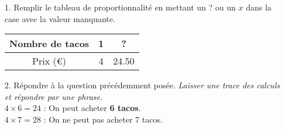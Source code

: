 \documentclass[12pt]{article}
\begin{document}
\begin{enumerate}
\item[1.] Remplir le tableau de proportionnalité en mettant un ? ou un $x$ dans la case avec la valeur manquante.

  \begin{center}
    \begin{tabular}{| c || c | c |}
      \hline
      Nombre de tacos & 1 &  ?   \\
      \hline
      Prix (\euro{})  & 4 & 24.50\\
      \hline
    \end{tabular}
  \end{center}

\item[2.] Répondre à la question précédemment posée. \textit{Laisser une trace des calculs et répondre par une phrase.}\\

$4 \times 6 = 24$ : On peut acheter \textbf{6 tacos}. \\
$4 \times 7 = 28$ : On ne peut pas acheter 7 tacos.

\end{enumerate}
\end{document}
